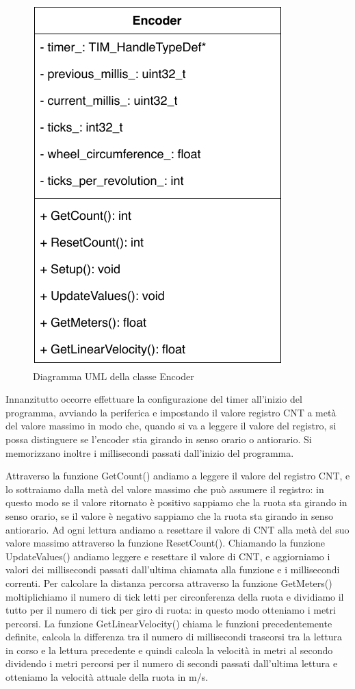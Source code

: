 \begin{figure}[htb]
    \centering
    \includegraphics[scale=0.80]{images/encoder_class.pdf}
    \caption{Diagramma UML della classe Encoder}
    \label{fig:encoder_class}
\end{figure}

Innanzitutto occorre effettuare la configurazione del timer all'inizio del programma, avviando la periferica e impostando il valore registro CNT a metà del valore massimo in modo che, quando si va a leggere il valore del registro, si possa distinguere se l'encoder stia girando in senso orario o antiorario. Si memorizzano inoltre i millisecondi passati dall'inizio del programma.

Attraverso la funzione GetCount() andiamo a leggere il valore del registro CNT, e lo sottraiamo dalla metà del valore massimo che può assumere il registro: in questo modo se il valore ritornato è positivo sappiamo che la ruota sta girando in senso orario, se il valore è negativo sappiamo che la ruota sta girando in senso antiorario. Ad ogni lettura andiamo a resettare il valore di CNT alla metà del suo valore massimo attraverso la funzione ResetCount().
Chiamando la funzione UpdateValues() andiamo leggere e resettare il valore di CNT, e aggiorniamo i valori dei millisecondi passati dall'ultima chiamata alla funzione e i millisecondi correnti.
Per calcolare la distanza percorsa attraverso la funzione GetMeters() moltiplichiamo il numero di tick letti per circonferenza della ruota e dividiamo il tutto per il numero di tick per giro di ruota: in questo modo otteniamo i metri percorsi.
La funzione GetLinearVelocity() chiama le funzioni precedentemente definite, calcola la differenza tra il numero di millisecondi trascorsi tra la lettura in corso e la lettura precedente e quindi calcola la velocità in metri al secondo dividendo i metri percorsi per il numero di secondi passati dall'ultima lettura e otteniamo la velocità attuale della ruota in m/s.

